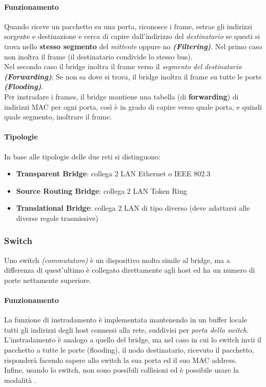 \documentclass[a4paper,11pt]{article}
\def\subsub#1{\subsubsection{#1}\label{#1}}
\def\para#1{\paragraph{#1}\label{#1}}
\def\vedi#1{\nameref{#1}}
\begin{document}
\paragraph{Funzionamento} Quando riceve un pacchetto su una porta, riconosce i frame, estrae gli indirizzi sorgente e destinazione e cerca di capire dall'indirizzo del \textit{destinatario} se questi si trova nello \textbf{stesso segmento} del \textit{mittente} oppure no \textbf{\textit{(Filtering)}}. Nel primo caso non inoltra il frame (il destinatario condivide lo stesso bus). \\Nel secondo caso il bridge inoltra il frame verso il \textit{segmento del destinatario} \textbf{\textit{(Forwarding)}}; Se non sa dove si trova, il bridge inoltra il frame su tutte le porte \textbf{\textit{(Flooding)}}. \\Per instradare i frames, il bridge mantiene una tabella (di \textbf{forwarding}) di indirizzi MAC per ogni porta, così è in grado di capire verso quale porta, e quindi quale segmento, inoltrare il frame. 
\para{Tipologie} In base alle tipologie delle due reti si distinguono:
\begin{itemize}
\item \textbf{Transparent Bridge}: collega 2 LAN Ethernet o IEEE 802.3
\item \textbf{Source Routing Bridge}: collega 2 LAN Token Ring
\item \textbf{Translational Bridge}: collega 2 LAN di tipo diverso (deve adattarsi alle diverse regole trasmissive)
\end{itemize}

\subsub{Switch} Uno switch \textit{(commutatore)} è un dispositivo molto simile al bridge, ma a differenza di quest'ultimo è collegato direttamente agli host ed ha un numero di porte nettamente superiore.
\paragraph{Funzionamento} La funzione di instradamento è implementata mantenendo in un buffer locale tutti gli indirizzi \vedi{MAC} degli host connessi alla rete, suddivisi per \textit{porta dello switch}.\\
L'instradamento è analogo a quello del bridge, ma nel caso in cui lo switch invii il pacchetto a tutte le porte (flooding), il nodo destinatario, ricevuto il pacchetto, risponderà facendo sapere allo switch la sua porta ed il suo MAC address.\\
Infine, usando lo switch, non sono possibili collisioni ed è possibile usare la modalità \vedi{Full-Duplex}.
\end{document}
